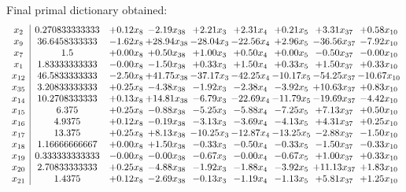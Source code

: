 \documentclass[8pt]{article}
\begin{document}
 Final primal dictionary obtained: 
\[\begin{array}{c| c c@{\hskip 2pt} c@{\hskip 2pt} c@{\hskip 2pt} c@{\hskip 2pt} c@{\hskip 2pt} c@{\hskip 2pt} c@{\hskip 2pt} }
 x_{2}   &  0.270833333333 & +  0.12 x_{8} & -2.19 x_{38} & +  2.21 x_{3} & +  2.31 x_{4} & +  0.21 x_{5} & +  3.31 x_{37} & +  0.58 x_{10}\\
 x_{9}   &  36.6458333333 & -1.62 x_{8} & + 28.94 x_{38} & -28.04 x_{3} & -22.56 x_{4} & +  2.96 x_{5} & -36.56 x_{37} & -7.92 x_{10}\\
 x_{7}   &  1.5 & +  0.00 x_{8} & +  0.50 x_{38} & +  1.00 x_{3} & +  0.50 x_{4} & +  0.00 x_{5} & -0.50 x_{37} & -0.00 x_{10}\\
 x_{1}   &  1.83333333333 & -0.00 x_{8} & -1.50 x_{38} & +  0.33 x_{3} & +  1.50 x_{4} & +  0.33 x_{5} & +  1.50 x_{37} & +  0.33 x_{10}\\
 x_{12}   &  46.5833333333 & -2.50 x_{8} & + 41.75 x_{38} & -37.17 x_{3} & -42.25 x_{4} & -10.17 x_{5} & -54.25 x_{37} & -10.67 x_{10}\\
 x_{35}   &  3.20833333333 & +  0.25 x_{8} & -4.38 x_{38} & -1.92 x_{3} & -2.38 x_{4} & -3.92 x_{5} & + 10.63 x_{37} & +  0.83 x_{10}\\
 x_{14}   &  10.2708333333 & +  0.13 x_{8} & + 14.81 x_{38} & -6.79 x_{3} & -22.69 x_{4} & -11.79 x_{5} & -19.69 x_{37} & -4.42 x_{10}\\
 x_{15}   &  6.375 & +  0.25 x_{8} & -0.88 x_{38} & -5.25 x_{3} & -5.88 x_{4} & -7.25 x_{5} & +  7.13 x_{37} & +  0.50 x_{10}\\
 x_{16}   &  4.9375 & +  0.12 x_{8} & -0.19 x_{38} & -3.13 x_{3} & -3.69 x_{4} & -4.13 x_{5} & +  4.31 x_{37} & +  0.25 x_{10}\\
 x_{17}   &  13.375 & +  0.25 x_{8} & +  8.13 x_{38} & -10.25 x_{3} & -12.87 x_{4} & -13.25 x_{5} & -2.88 x_{37} & -1.50 x_{10}\\
 x_{18}   &  1.16666666667 & +  0.00 x_{8} & +  1.50 x_{38} & -0.33 x_{3} & -0.50 x_{4} & -0.33 x_{5} & -1.50 x_{37} & -0.33 x_{10}\\
 x_{19}   &  0.333333333333 & -0.00 x_{8} & -0.00 x_{38} & -0.67 x_{3} & -0.00 x_{4} & -0.67 x_{5} & +  1.00 x_{37} & +  0.33 x_{10}\\
 x_{20}   &  2.70833333333 & +  0.25 x_{8} & -4.88 x_{38} & -1.92 x_{3} & -1.88 x_{4} & -3.92 x_{5} & + 11.13 x_{37} & +  1.83 x_{10}\\
 x_{21}   &  1.4375 & +  0.12 x_{8} & -2.69 x_{38} & -0.13 x_{3} & -1.19 x_{4} & -1.13 x_{5} & +  5.81 x_{37} & +  1.25 x_{10}\\

\end{array}\]
\end{document}

